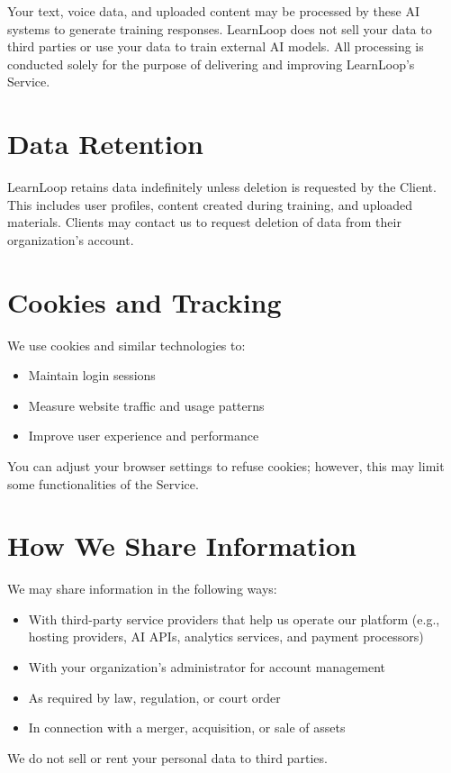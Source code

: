 \documentclass[12pt]{article}
\begin{document}
Your text, voice data, and uploaded content may be processed by these AI systems to generate training responses. LearnLoop does not sell your data to third parties or use your data to train external AI models. All processing is conducted solely for the purpose of delivering and improving LearnLoop’s Service.

\section{Data Retention}
LearnLoop retains data indefinitely unless deletion is requested by the Client. This includes user profiles, content created during training, and uploaded materials. Clients may contact us to request deletion of data from their organization’s account.

\section{Cookies and Tracking}
We use cookies and similar technologies to:
\begin{itemize}[leftmargin=*]
    \item Maintain login sessions
    \item Measure website traffic and usage patterns
    \item Improve user experience and performance
\end{itemize}
You can adjust your browser settings to refuse cookies; however, this may limit some functionalities of the Service.

\section{How We Share Information}
We may share information in the following ways:
\begin{itemize}[leftmargin=*]
    \item With third-party service providers that help us operate our platform (e.g., hosting providers, AI APIs, analytics services, and payment processors)
    \item With your organization’s administrator for account management
    \item As required by law, regulation, or court order
    \item In connection with a merger, acquisition, or sale of assets
\end{itemize}

We do not sell or rent your personal data to third parties.
\end{document}
